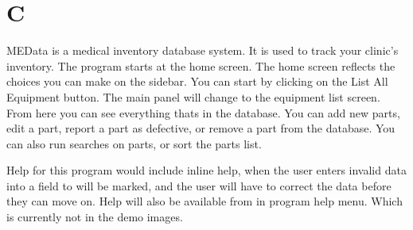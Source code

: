 \documentclass[16pt]{report}
\begin{document}
\chapter*{C}

MEData is a medical inventory database system.  It is used to track your
clinic's inventory.  The program starts at the home screen.  The home screen
reflects the choices you can make on the sidebar.  You can start by 
clicking on the List All Equipment button.  The main panel will change to 
the equipment list screen.  From here you can see everything thats in the
database.  You can add new parts, edit a part, report a part as defective,
or remove a part from the database.  You can also run searches on parts, or
sort the parts list.

Help for this program would include inline help, when the user enters
invalid data into a field to will be marked, and the user will have to
correct the data before they can move on.  Help will also be available 
from in program help menu.  Which is currently not in the demo images.
\end{document}
